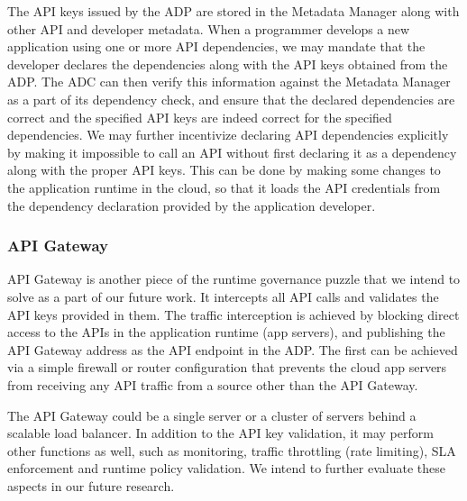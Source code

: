 The API keys issued by the ADP are stored in the Metadata Manager along with other API and developer metadata. When a programmer develops a new application
using one or more API dependencies, we may mandate that the developer declares the dependencies along with the API keys obtained from the ADP. The ADC
can then verify this information against the Metadata Manager as a part of its dependency check, and ensure that the declared dependencies are correct and 
the specified API keys are indeed correct for the specified dependencies. We may further incentivize declaring API dependencies explicitly by making it 
impossible to call an API without first declaring it as a dependency along with the proper API keys. This can be done by making some changes to the application
runtime in the cloud, so that it loads the API credentials from the dependency declaration provided by the application developer.

\subsubsection{API Gateway}
API Gateway is another piece of the runtime governance puzzle that we intend to solve as a part of our future work. It intercepts all API calls and validates the API
keys provided in them. The traffic interception is achieved by blocking direct access to the APIs in the application runtime (app servers), and publishing the API 
Gateway address as the API endpoint in the ADP. The first can be achieved via a simple firewall or router configuration that prevents the cloud app servers from 
receiving any API traffic from a source other than the API Gateway.

The API Gateway could be a single server or a cluster of servers behind a scalable load balancer. In addition to the API key validation, it may perform other
functions as well, such as monitoring, traffic throttling (rate limiting), SLA enforcement and runtime policy validation. We intend to further evaluate these aspects
in our future research.